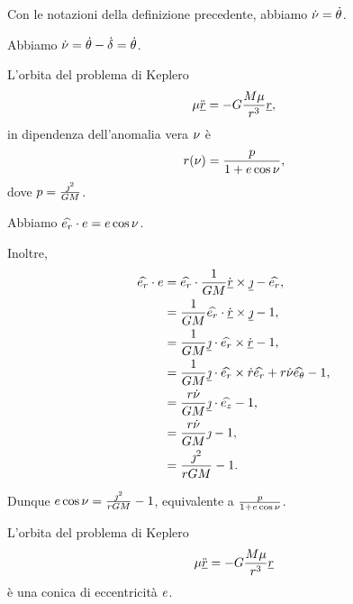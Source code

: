 \begin{Lemma}
	Con le notazioni della definizione precedente, abbiamo $\dot{\nu} = \dot{\theta}$.
\end{Lemma}
\Proof Abbiamo $\dot{\nu} = \dot{\theta} - \dot{\delta} = \dot{\theta}$. \EndProof
\begin{Theorem}
	L'orbita del problema di Keplero
	\[
		\mu \ddot{\underline{r}} = - G \frac{M\mu}{r^3}\underline{r},
	\]
	in dipendenza dell'anomalia vera $\nu$ \`e
	\[
		r(\nu) = \frac{p}{1 + e \cos{\nu}},
	\]
	dove $p = \frac{\jmath^2}{G M}$.
\end{Theorem}
\Proof Abbiamo $\widehat{e_r} \cdot e = e \cos{\nu}$.
\par Inoltre,
\begin{align*}
	\widehat{e_r} \cdot e
	&= \widehat{e_r} \cdot \frac{1}{GM}\dot{\underline{r}} \times \underline{\jmath} - \widehat{e_r},\\
	&= \frac{1}{GM} \widehat{e_r} \cdot \dot{\underline{r}} \times \underline{\jmath} - 1,\\
	&= \frac{1}{GM} \underline{\jmath} \cdot \widehat{e_r} \times \dot{\underline{r}} - 1,\\
	&= \frac{1}{GM} \underline{\jmath} \cdot \widehat{e_r} \times \dot{r}\widehat{e_r} + r\dot{\nu}\widehat{e_\theta} - 1,\\
	&= \frac{r\dot{\nu}}{GM} \underline{\jmath} \cdot \widehat{e_z} - 1,\\
	&= \frac{r\dot{\nu}}{GM}\jmath - 1,\\
	&= \frac{\jmath^2}{rGM} - 1.
\end{align*}
\par Dunque $e \cos{\nu} = \frac{\jmath^2}{rGM} - 1$, equivalente a $\frac{p}{1 + e \cos{\nu}}$. \EndProof
\begin{Theorem}
	L'orbita del problema di Keplero
	\[
		\mu \ddot{\underline{r}} = - G \frac{M\mu}{r^3}\underline{r}
	\]
	\`e una conica di eccentricit\`a $e$.
\end{Theorem}
